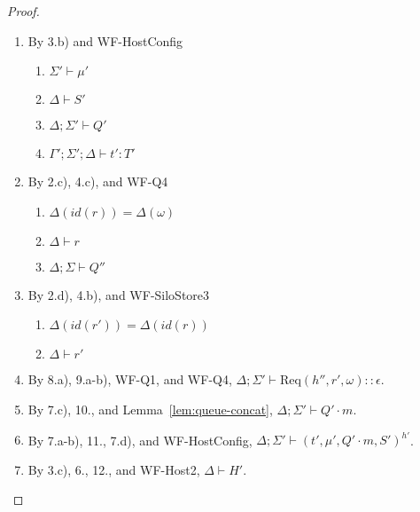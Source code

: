 \documentclass{article}
\theoremstyle{definition}
\newcommand{\Req}[3]{\text{Req}(#1, #2, #3)}
\begin{document}
\begin{proof}
\begin{itemize}
\begin{enumerate}
\item By 3.b) and WF-HostConfig
  \begin{enumerate}[label=(\alph*)]
  \item $\Sigma' \vdash \mu'$
  \item $\Delta \vdash S'$
  \item $\Delta ; \Sigma' \vdash Q'$
  \item $\Gamma' ; \Sigma' ; \Delta \vdash t' : T'$
  \end{enumerate}
\item By 2.c), 4.c), and WF-Q4
  \begin{enumerate}[label=(\alph*)]
  \item $\Delta(id(r)) = \Delta(\omega)$
  \item $\Delta \vdash r$
  \item $\Delta ; \Sigma \vdash Q''$
  \end{enumerate}
\item By 2.d), 4.b), and WF-SiloStore3
  \begin{enumerate}[label=(\alph*)]
  \item $\Delta(id(r')) = \Delta(id(r))$
  \item $\Delta \vdash r'$
  \end{enumerate}
\item By 8.a), 9.a-b), WF-Q1, and WF-Q4, $\Delta ; \Sigma' \vdash {\Req {h''} {r'} \omega} :: \epsilon$.
\item By 7.c), 10., and Lemma~\ref{lem:queue-concat}, $\Delta ; \Sigma' \vdash Q' \cdot m$.
\item By 7.a-b), 11., 7.d), and WF-HostConfig, $\Delta ; \Sigma' \vdash (t', \mu', Q' \cdot m, S')^{h'}$.
\item By 3.c), 6., 12., and WF-Host2, $\Delta \vdash H'$.
\end{enumerate}


\end{itemize}
\end{proof}
\end{document}
